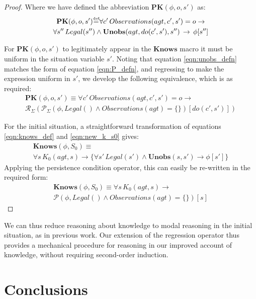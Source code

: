 \documentclass[letterpaper]{article}
\newcommand{\isdef}{\hbox{$\stackrel{\mbox{\tiny def}}{=}$}}
\begin{document}
\begin{proof}
Where we have defined the abbreviation $\mathbf{PK}(\phi,o,s')$ as:
\begin{multline*}
\mathbf{PK}(\phi,o,s')\isdef\forall c'\, Observations(agt,c',s')=o\rightarrow\\
\forall s''\, Legal(s'')\wedge\mathbf{Unobs}(agt,do(c',s'),s'')\,\rightarrow\,\phi[s'']\end{multline*}


For $\mathbf{PK}(\phi,o,s')$ to legitimately appear in the $\mathbf{Knows}$
macro it must be uniform in the situation variable $s'$. Noting that
equation \ref{eqn:unobs_defn} matches the form of equation \ref{eqn:P_defn},
and regressing to make the expression uniform in $s'$, we develop
the following equivalence, which is as required: \begin{multline*}
\mathbf{PK}(\phi,o,s')\equiv\forall c'\, Observations(agt,c',s')=o\rightarrow\\
\mathcal{R}_{\Sigma}(\mathcal{P}_{\Sigma}(\phi,Legal()\wedge Observations(agt)=\{\})[do(c',s')])\end{multline*}


For the initial situation, a straightforward transformation of equations
\ref{eqn:knows_def} and \ref{eqn:new_k_s0} gives: \begin{multline*}
\mathbf{Knows}(\phi,S_{0})\equiv\\
\forall s\, K_{0}(agt,s)\rightarrow\{\forall s'\, Legal(s')\wedge\mathbf{Unobs}(s,s')\rightarrow\phi[s']\}\end{multline*}
 Applying the persistence condition operator, this can easily be re-written
in the required form: \begin{multline*}
\mathbf{Knows}(\phi,S_{0})\equiv \forall s\, K_{0}(agt,s) \rightarrow\\
\mathcal{P}(\phi,Legal()\wedge Observations(agt)=\{\})[s]\end{multline*}


\end{proof}

We can thus reduce reasoning about knowledge to modal reasoning in
the initial situation, as in previous work. Our extension of the regression
operator thus provides a mechanical procedure for reasoning in our
improved account of knowledge, without requiring second-order induction. 


\section{Conclusions\label{sec:Conclusions}}
\end{document}

